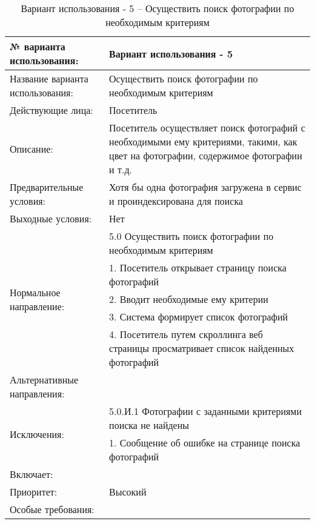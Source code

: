 \begin{table}[H]
  \caption{Вариант использования - 5 – Осуществить поиск фотографии по необходимым критериям}\label{use-case-5-table}
  \begin{tabular}{|p{6cm}|p{10cm}|}
  \hline № варианта использования: & Вариант использования - 5 \\
  \hline Название варианта использования: & Осуществить поиск фотографии по необходимым критериям \\
  \hline Действующие лица: & Посетитель \\
  \hline Описание: & Посетитель осуществляет поиск фотографий с необходимыми ему критериями, такими, как цвет на фотографии, содержимое фотографии и т.д. \\
  \hline Предварительные условия: & Хотя бы одна фотография загружена в сервис и проиндексирована для поиска \\
  \hline Выходные условия: & Нет \\
  \hline \multirow{5}{*}{Нормальное направление:} & 5.0 Осуществить поиск фотографии по необходимым критериям \\
  \cline{2-2} & 1. Посетитель открывает страницу поиска фотографий \\
  \cline{2-2} & 2. Вводит необходимые ему критерии \\
  \cline{2-2} & 3. Система формирует список фотографий \\
  \cline{2-2} & 4. Посетитель путем скроллинга веб страницы просматривает список найденных фотографий \\
  \hline Альтернативные направления: &  \\
  \hline \multirow{2}{*}{Исключения:} & 5.0.И.1 Фотографии с заданными критериями поиска не найдены \\
  \cline{2-2} & 1. Сообщение об ошибке на странице поиска фотографий \\
  \hline Включает: &  \\
  \hline Приоритет: & Высокий \\
  \hline Особые требования: &  \\
  \hline 
  \end{tabular}
\end{table}

